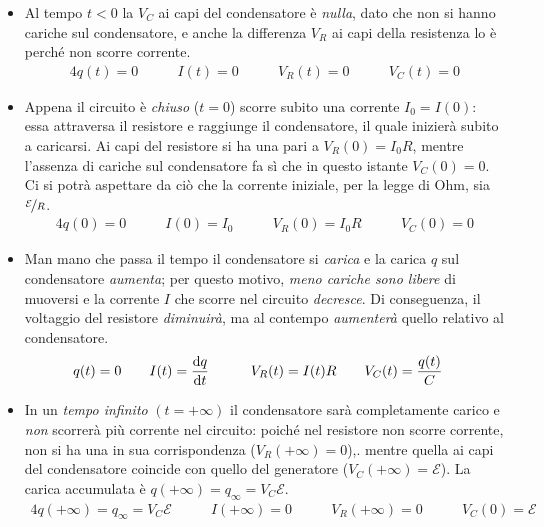 \begin{itemize}
	\item Al tempo $t<0$ la \ddp $V_C$ ai capi del condensatore è \textit{nulla}, dato che non si hanno cariche sul condensatore, e anche la differenza $V_R$ ai capi della resistenza lo è perché non scorre corrente.
	\begin{alignat*}{4}
		q(t)=0 &\qquad I(t)=0 &\qquad V_R(t)=0 &\qquad V_C(t)=0
	\end{alignat*}
	\item Appena il circuito è \textit{chiuso} ($t=0$) scorre subito una corrente $I_0=I(0)$: essa attraversa il resistore e raggiunge il condensatore, il quale inizierà subito a caricarsi. Ai capi del resistore si ha una \ddp pari a $V_R(0)=I_0R$, mentre l'assenza di cariche sul condensatore fa sì che in questo istante $V_C(0)=0$. Ci si potrà aspettare da ciò che la corrente iniziale, per la legge di Ohm, sia $\nicefrac{\mathcal{E}}{R}$.
	\begin{alignat*}{4}
		q(0)=0 &\qquad I(0)=I_0 &\qquad V_R(0)=I_0R &\qquad V_C(0)=0
	\end{alignat*}
	\item Man mano che passa il tempo il condensatore si \textit{carica} e la carica $q$ sul condensatore \textit{aumenta}; per questo motivo, \textit{meno cariche sono libere} di muoversi e la corrente $I$ che scorre nel circuito \textit{decresce}. Di conseguenza, il voltaggio del resistore \textit{diminuirà}, ma al contempo \textit{aumenterà} quello relativo al condensatore.
	\begin{alignat*}{4}
		q(t)=0 &\qquad I(t)=\dv{q}{t} &\qquad V_R(t)=I(t)R &\qquad V_C(t)=\frac{q(t)}{C}
	\end{alignat*}
	\item In un \textit{tempo infinito} $(t=+\infty)$ il condensatore sarà completamente carico e \textit{non} scorrerà più corrente nel circuito: poiché nel resistore non scorre corrente, non si ha una \ddp in sua corrispondenza ($V_R(+\infty)=0$),. mentre quella ai capi del condensatore coincide con quello del generatore ($V_C(+\infty)=\mathcal{E}$). La carica accumulata è $q(+\infty)=q_{\infty}=V_C\mathcal{E}$.
	\begin{alignat*}{4}
		q(+\infty)=q_{\infty}=V_C\mathcal{E} &\qquad I(+\infty)=0 &\qquad V_R(+\infty)=0 &\qquad V_C(0)=\mathcal{E}
	\end{alignat*}
\end{itemize}
